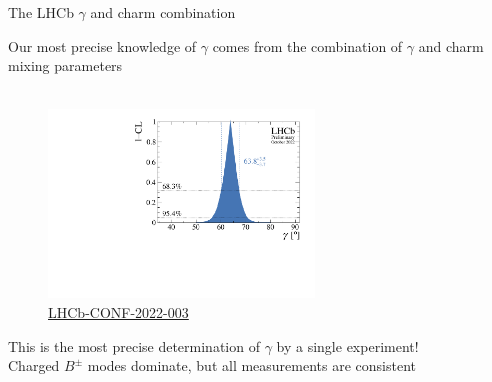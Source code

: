 \documentclass[dvipsnames]{beamer}
\begin{document}
\begin{frame}{The LHCb $\gamma$ and charm combination}
  \begin{center}
    {\Large Our most precise knowledge of $\gamma$ comes from the combination of $\gamma$ and charm mixing parameters}\\~\\
  \end{center}
  \vspace{-0.5cm}
  \begin{figure}
    \includegraphics[height=5.0cm]{Plots/gammacharm_lhcb_gamma_only.pdf}
    \vspace{-0.5cm}
    \caption*{\tiny\href{https://lhcbproject.web.cern.ch/Publications/LHCbProjectPublic/LHCb-CONF-2022-003.html}{LHCb-CONF-2022-003}}
  \end{figure}
  \vspace{-0.5cm}
  \begin{center}
    This is the most precise determination of $\gamma$ by a single experiment!\\
    Charged $B^\pm$ modes dominate, but all measurements are consistent 
  \end{center}
\end{frame}
\end{document}
